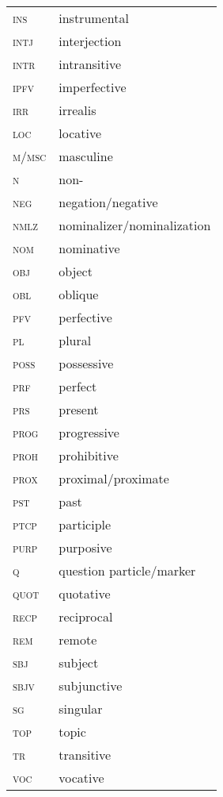 {\begin{tabularx}{.45\textwidth}{lQ}
\textsc{ins} & instrumental \\
\textsc{intj} & interjection \\
\textsc{intr} & intransitive \\
\textsc{ipfv} & imperfective \\
\textsc{irr} & irrealis \\
\textsc{loc} & locative \\
\textsc{m/msc} & masculine \\
\textsc{n} & non- \\
\textsc{neg} & negation/negative \\
\textsc{nmlz} & nominalizer/nominalization \\
\textsc{nom} & nominative \\
\textsc{obj} & object \\
\textsc{obl} & oblique \\
\textsc{pfv} & perfective \\
\textsc{pl} & plural \\
\textsc{poss} & possessive\\
\textsc{prf} & perfect \\
\textsc{prs} & present \\
\textsc{prog} & progressive \\
\textsc{proh} & prohibitive \\
\textsc{prox} & proximal/proximate \\
\textsc{pst} & past \\
\textsc{ptcp} & participle\\
\textsc{purp} & purposive \\
\textsc{q} & question particle/marker \\
\textsc{quot} & quotative \\
\textsc{recp} & reciprocal \\
\textsc{rem} & remote \\
\textsc{sbj} & subject \\
\textsc{sbjv} & subjunctive\\
\textsc{sg} & singular \\
\textsc{top} & topic \\
\textsc{tr} & transitive \\
\textsc{voc} & vocative \\ 
\end{tabularx}
}
